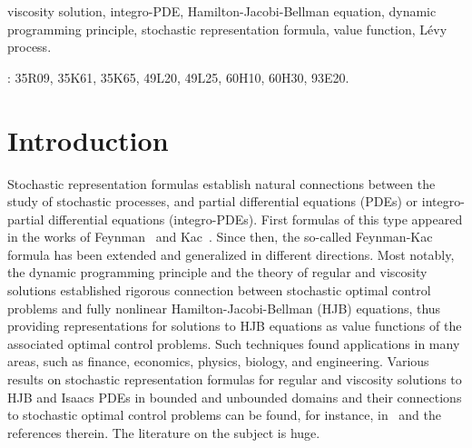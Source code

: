 \documentclass[amscd,amssymb,11pt]{article}
\title{\vspace{-3ex}{\bf Stochastic Representations for Solutions to Parabolic Dirichlet Problems for  Nonlocal Bellman Equations}}
\author{
    \textsc{Ruoting Gong}\\
    \textit{Department of Applied Mathematics, Illinois Institute of Technology}\\
    \textit{Chicago, IL 60616, U.S.A.}\\
    \textit{E-mail: rgong2@iit.edu} \\
\vspace{0.1cm}\\
    \textsc{Chenchen Mou}\\
    \textit{Department of Mathematics, UCLA}\\
    \textit{Los Angeles, CA 90095, U.S.A.}\\
    \textit{E-mail: muchenchen@math.ucla.edu}
\vspace{0.1cm}\\
    {\small AND}
\vspace{0.1cm} \\
    \textsc{Andrzej \Swiech}\\
    \textit{School of Mathematics, Georgia Institute of Technology}\\
    \textit{Atlanta, GA 30332, U.S.A.}\\
    \textit{E-mail: swiech@math.gatech.edu}}
\date{}
\numberwithin{theorem}{section}
\numberwithin{equation}{section}
\let\Section=\section
\def\section{\setcounter{equation}{0}\Section}\sf
\begin{document}
\maketitle


\begin{abstract}

We prove a stochastic representation formula for the viscosity solution of Dirichlet terminal-boundary value problem for a degenerate
Hamilton-Jacobi-Bellman integro-partial differential equation in a bounded domain. We show that the unique viscosity solution is the value function of the associated stochastic optimal control problem. We also obtain the dynamic programming principle for the associated stochastic optimal control problem in a bounded domain.

\end{abstract}

\vspace{0.2cm}

 viscosity solution, integro-PDE, Hamilton-Jacobi-Bellman equation, dynamic programming principle, stochastic representation formula, value function, L\'{e}vy process.

\vspace{0.2cm}

: 35R09, 35K61, 35K65, 49L20, 49L25, 60H10, 60H30, 93E20.



\section{Introduction}



Stochastic representation formulas establish natural connections between the study of stochastic processes, and partial differential equations (PDEs) or integro-partial differential equations (integro-PDEs). First formulas of this type appeared in the works of Feynman~\cite{Feynman:1948} and Kac~\cite{Kac:1949}. Since then, the so-called Feynman-Kac formula has been extended and generalized in different directions. Most notably, the dynamic programming principle and the theory of regular and viscosity solutions established rigorous connection between stochastic optimal control problems and fully nonlinear Hamilton-Jacobi-Bellman (HJB) equations, thus providing representations for solutions to HJB equations as value functions of the associated optimal control problems. Such techniques found applications in many areas, such as finance, economics, physics, biology, and engineering. Various results on stochastic representation formulas for regular and viscosity solutions to HJB and Isaacs PDEs in bounded and unbounded domains and their connections to stochastic optimal control problems can be found, for instance, in~\cite{BuckdahnLi:2008,FlemingSoner:2006,FlemingSouganidis:1989,Katsoulakis:1995,Kovats:2009,Krylov:1980,Lions:1983(1),Lions:1983(2),MaZhang:2002,Nisio:2015,
PardouxPeng:1992,Swiech:1996,Touzi:2002,Touzi:2013,YongZhou:1999,Zhang:2005} and the references therein. The literature on the subject is huge.
\end{document}
